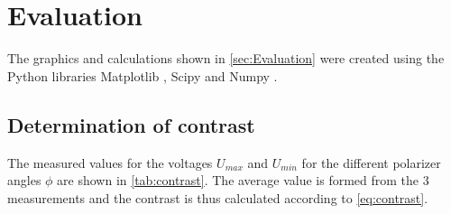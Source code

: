 \section{Evaluation}
\label{sec:Evaluation}
The graphics and calculations shown in \autoref{sec:Evaluation} were created using the Python libraries Matplotlib \cite{matplotlib}, Scipy \cite{scipy} and Numpy \cite{numpy}.

\subsection{Determination of contrast}
The measured values for the voltages $U_{max}$ and $U_{min}$ for the different polarizer angles $\phi$ are shown in \autoref{tab:contrast}. 
The average value is formed from the 3 measurements and the contrast is thus calculated according to \autoref{eq:contrast}.

